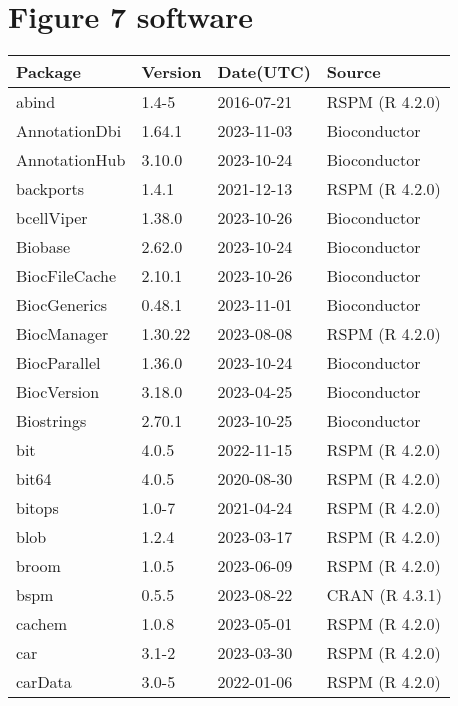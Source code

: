 
\section{Figure 7 software}\label{app3}

\begin{tabular}{llll}
Package & Version & Date(UTC) & Source\\
\hline
abind & 1.4-5 & 2016-07-21 & RSPM (R 4.2.0)\\
AnnotationDbi & 1.64.1 & 2023-11-03 & Bioconductor\\
AnnotationHub & 3.10.0 & 2023-10-24 & Bioconductor\\
backports & 1.4.1 & 2021-12-13 & RSPM (R 4.2.0)\\
bcellViper & 1.38.0 & 2023-10-26 & Bioconductor\\
\addlinespace
Biobase & 2.62.0 & 2023-10-24 & Bioconductor\\
BiocFileCache & 2.10.1 & 2023-10-26 & Bioconductor\\
BiocGenerics & 0.48.1 & 2023-11-01 & Bioconductor\\
BiocManager & 1.30.22 & 2023-08-08 & RSPM (R 4.2.0)\\
BiocParallel & 1.36.0 & 2023-10-24 & Bioconductor\\
\addlinespace
BiocVersion & 3.18.0 & 2023-04-25 & Bioconductor\\
Biostrings & 2.70.1 & 2023-10-25 & Bioconductor\\
bit & 4.0.5 & 2022-11-15 & RSPM (R 4.2.0)\\
bit64 & 4.0.5 & 2020-08-30 & RSPM (R 4.2.0)\\
bitops & 1.0-7 & 2021-04-24 & RSPM (R 4.2.0)\\
\addlinespace
blob & 1.2.4 & 2023-03-17 & RSPM (R 4.2.0)\\
broom & 1.0.5 & 2023-06-09 & RSPM (R 4.2.0)\\
bspm & 0.5.5 & 2023-08-22 & CRAN (R 4.3.1)\\
cachem & 1.0.8 & 2023-05-01 & RSPM (R 4.2.0)\\
car & 3.1-2 & 2023-03-30 & RSPM (R 4.2.0)\\
\addlinespace
carData & 3.0-5 & 2022-01-06 & RSPM (R 4.2.0)\\

\end{tabular}
